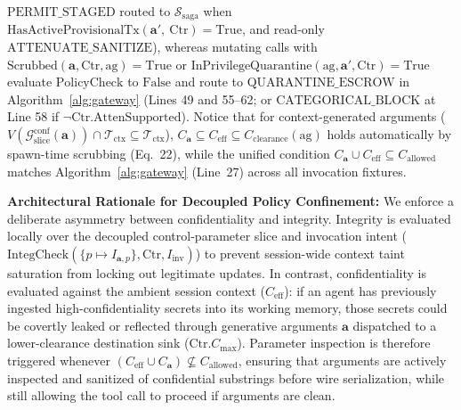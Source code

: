 \documentclass[conference,10pt]{IEEEtran}
\begin{document}
$\text{PERMIT\_STAGED}$ routed to $\mathcal{S}_{\text{saga}}$ when $\text{HasActiveProvisionalTx}(\mathbf{a}',\allowbreak\ \text{Ctr}) = \text{True}$, and read-only $\text{ATTENUATE\_SANITIZE}$), whereas mutating calls with $\text{Scrubbed}(\mathbf{a}, \text{Ctr}, \text{ag}) = \text{True}$ or $\text{InPrivilegeQuarantine}(\text{ag}, \mathbf{a}', \text{Ctr}) = \text{True}$ evaluate $\text{PolicyCheck}$ to $\text{False}$ and route to $\text{QUARANTINE\_ESCROW}$ in Algorithm~\ref{alg:gateway} (Lines 49 and 55--62; or $\text{CATEGORICAL\_BLOCK}$ at Line 58 if $\neg\text{Ctr.AttenSupported}$). Notice that for context-generated arguments ($V(\mathcal{G}_{\text{slice}}^{\text{conf}}(\mathbf{a})) \cap \mathcal{T}_{\text{ctx}} \subseteq \mathcal{T}_{\text{ctx}}$), $C_{\mathbf{a}} \subseteq C_{\text{eff}} \subseteq C_{\text{clearance}}(\text{ag})$ holds automatically by spawn-time scrubbing (Eq.~22), while the unified condition $C_{\mathbf{a}} \cup C_{\text{eff}} \subseteq C_{\text{allowed}}$ matches Algorithm~\ref{alg:gateway} (Line~27) across all invocation fixtures.

\noindent\textbf{Architectural Rationale for Decoupled Policy Confinement:} We enforce a deliberate asymmetry between confidentiality and integrity. Integrity is evaluated locally over the decoupled control-parameter slice and invocation intent ($\text{IntegCheck}(\{p \mapsto I_{\mathbf{a}, p}\}, \text{Ctr}, I_{\text{inv}})$) to prevent session-wide context taint saturation from locking out legitimate updates. In contrast, confidentiality is evaluated against the ambient session context ($C_{\text{eff}}$): if an agent has previously ingested high-confidentiality secrets into its working memory, those secrets could be covertly leaked or reflected through generative arguments $\mathbf{a}$ dispatched to a lower-clearance destination sink ($\text{Ctr}.C_{\text{max}}$). Parameter inspection is therefore triggered whenever $(C_{\text{eff}} \cup C_{\mathbf{a}}) \not\subseteq C_{\text{allowed}}$, ensuring that arguments are actively inspected and sanitized of confidential substrings before wire serialization, while still allowing the tool call to proceed if arguments are clean.
\end{document}
